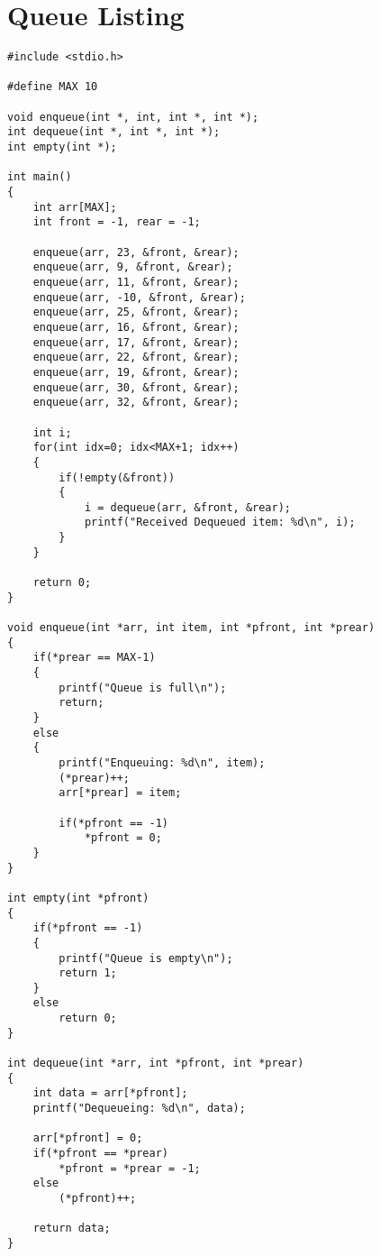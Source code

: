 \documentclass[10pt, a4paper, twosize]{article}
\begin{document}
\section{Queue Listing}
\label{queue_listing}
\begin{lstlisting}
#include <stdio.h>

#define MAX 10

void enqueue(int *, int, int *, int *);
int dequeue(int *, int *, int *);
int empty(int *);

int main()
{
    int arr[MAX];
    int front = -1, rear = -1;

    enqueue(arr, 23, &front, &rear);
    enqueue(arr, 9, &front, &rear);
    enqueue(arr, 11, &front, &rear);
    enqueue(arr, -10, &front, &rear);
    enqueue(arr, 25, &front, &rear);
    enqueue(arr, 16, &front, &rear);
    enqueue(arr, 17, &front, &rear);
    enqueue(arr, 22, &front, &rear);
    enqueue(arr, 19, &front, &rear);
    enqueue(arr, 30, &front, &rear);
    enqueue(arr, 32, &front, &rear);

    int i;
    for(int idx=0; idx<MAX+1; idx++)
    {
        if(!empty(&front))
        {
            i = dequeue(arr, &front, &rear);
            printf("Received Dequeued item: %d\n", i);
        }
    }

    return 0;
}

void enqueue(int *arr, int item, int *pfront, int *prear)
{
    if(*prear == MAX-1)
    {
        printf("Queue is full\n");
        return;
    }
    else
    {
        printf("Enqueuing: %d\n", item);
        (*prear)++;
        arr[*prear] = item;

        if(*pfront == -1)
            *pfront = 0;
    }
}

int empty(int *pfront)
{
    if(*pfront == -1)
    {
        printf("Queue is empty\n");
        return 1;
    }
    else
        return 0;
}

int dequeue(int *arr, int *pfront, int *prear)
{
    int data = arr[*pfront];
    printf("Dequeueing: %d\n", data);
    
    arr[*pfront] = 0;
    if(*pfront == *prear)
        *pfront = *prear = -1;
    else
        (*pfront)++;
        
    return data;
}
\end{lstlisting}






\end{document}
